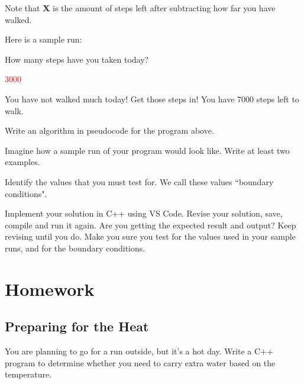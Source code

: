 Note that \textbf{X} is the amount of steps left after subtracting how far you have walked. 

Here is a sample run:

\begin{sample}
How many steps have you taken today?

\textcolor{red}{3000}

You have not walked much today! Get those steps in! You have 7000 steps left to walk.
\end{sample}

\begin{multipart}
    Write an algorithm in pseudocode for the program above.
\end{multipart}

\vspace{4cm}

\begin{multipart}
     Imagine how a sample run of your program would look like. Write at least two examples.
\end{multipart}

\vspace{4cm}

\begin{multipart}
    Identify the values that you must test for. We call these values ``boundary conditions".
\end{multipart}

\vspace{4cm}

\begin{multipart}
    Implement your solution in C++ using VS Code. Revise your solution, save, compile and run it again. Are you getting the expected result and output? Keep revising until you do. Make you sure you test for the values used in your sample runs, and for the boundary conditions. 
\end{multipart}

\section{Homework}

\subsection{Preparing for the Heat}

You are planning to go for a run outside, but it's a hot day. Write a C++ program to determine whether you need to carry extra water based on the temperature. \\

